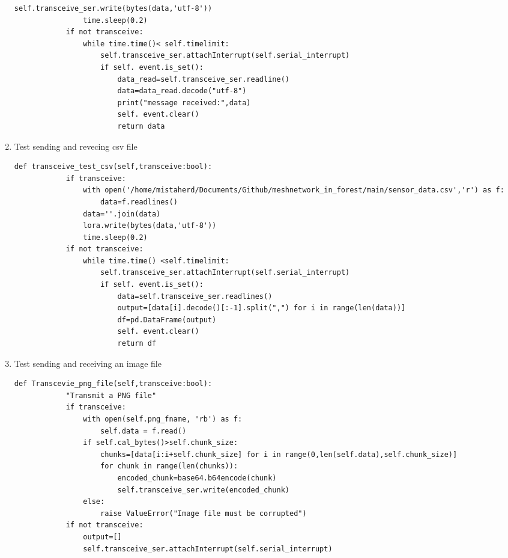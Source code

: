 \begin{enumerate}
\begin{lstlisting}[style=mystyle]
                self.transceive_ser.write(bytes(data,'utf-8'))
                time.sleep(0.2)
            if not transceive:
                while time.time()< self.timelimit:
                    self.transceive_ser.attachInterrupt(self.serial_interrupt)
                    if self. event.is_set():
                        data_read=self.transceive_ser.readline()
                        data=data_read.decode("utf-8")
                        print("message received:",data)
                        self. event.clear()
                        return data
    \end{lstlisting}
    \item Test sending and revecing csv file
    \begin{lstlisting}[style=mystyle]
        def transceive_test_csv(self,transceive:bool):
            if transceive:
                with open('/home/mistaherd/Documents/Github/meshnetwork_in_forest/main/sensor_data.csv','r') as f:
                    data=f.readlines()
                data=''.join(data)
                lora.write(bytes(data,'utf-8'))
                time.sleep(0.2)
            if not transceive:
                while time.time() <self.timelimit:
                    self.transceive_ser.attachInterrupt(self.serial_interrupt)
                    if self. event.is_set():
                        data=self.transceive_ser.readlines()
                        output=[data[i].decode()[:-1].split(",") for i in range(len(data))]
                        df=pd.DataFrame(output)
                        self. event.clear()
                        return df
    \end{lstlisting}
    \item Test sending and receiving an image file
    \begin{lstlisting}[style=mystyle]
        def Transcevie_png_file(self,transceive:bool):
            "Transmit a PNG file"
            if transceive:
                with open(self.png_fname, 'rb') as f:
                    self.data = f.read()
                if self.cal_bytes()>self.chunk_size:
                    chunks=[data[i:i+self.chunk_size] for i in range(0,len(self.data),self.chunk_size)]
                    for chunk in range(len(chunks)):
                        encoded_chunk=base64.b64encode(chunk)
                        self.transceive_ser.write(encoded_chunk)
                else:
                    raise ValueError("Image file must be corrupted")
            if not transceive:
                output=[]
                self.transceive_ser.attachInterrupt(self.serial_interrupt)

\end{lstlisting}
\end{enumerate}
